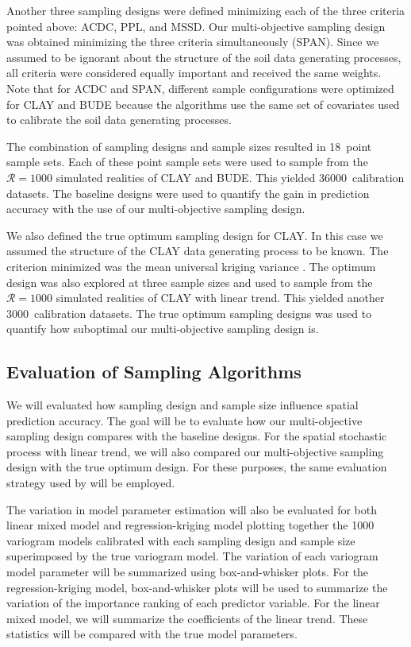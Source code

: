 Another three sampling designs were defined minimizing each of the three criteria pointed above: ACDC, PPL, and 
MSSD. Our multi-objective sampling design was obtained minimizing the three criteria simultaneously (SPAN). 
Since we assumed to be ignorant about the structure of the soil data generating processes, all criteria were 
considered equally important and received the same weights. Note that for ACDC and SPAN, different sample 
configurations were optimized for CLAY and BUDE because the algorithms use the same set of covariates used to 
calibrate the soil data generating processes.

The combination of sampling designs and sample sizes resulted in 18~point sample sets. Each of these point 
sample sets were used to sample from the $\mathcal{R} = 1000$ simulated realities of CLAY and BUDE. This 
yielded \num{36000}~calibration datasets. The baseline designs were used to quantify the gain in prediction 
accuracy with the use of our multi-objective sampling design.

We also defined the true optimum sampling design for CLAY. In this case we assumed the structure of the CLAY 
data generating process to be known. The criterion minimized was the mean universal kriging variance 
\cite{BrusEtAl2007a}. The optimum design was also explored at three sample sizes and used to sample from the 
$\mathcal{R} = 1000$ simulated realities of CLAY with linear trend. This yielded another 3000~calibration 
datasets. The true optimum sampling designs was used to quantify how suboptimal our multi-objective sampling 
design is.

\subsection{Evaluation of Sampling Algorithms}

We will evaluated how sampling design and sample size influence spatial prediction accuracy. The goal will be 
to evaluate how our multi-objective sampling design compares with the baseline designs. For the spatial 
stochastic process with linear trend, we will also compared our multi-objective sampling design with the true 
optimum design. For these purposes, the same evaluation strategy used by \cite{Samuel-RosaEtAl} will be 
employed.

The variation in model parameter estimation will also be evaluated for both linear mixed model and 
regression-kriging model plotting together the 1000 variogram models calibrated with each sampling design and 
sample size superimposed by the true variogram model. The variation of each variogram model parameter will be 
summarized using box-and-whisker plots. For the regression-kriging model, box-and-whisker plots will be used 
to summarize the variation of the importance ranking of each predictor variable. For the linear mixed model, 
we will summarize the coefficients of the linear trend. These statistics will be compared with the true model 
parameters.

